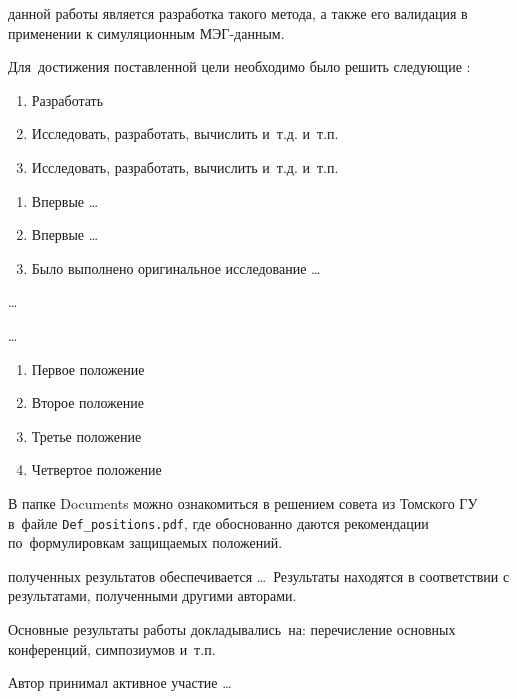 
{\aim} данной работы является разработка такого метода,
а также его валидация в применении к симуляционным МЭГ-данным.

Для~достижения поставленной цели необходимо было решить следующие {\tasks}:
\begin{enumerate}
  \item Разработать 
  \item Исследовать, разработать, вычислить и~т.\:д. и~т.\:п.
  \item Исследовать, разработать, вычислить и~т.\:д. и~т.\:п.
\end{enumerate}


{\novelty}
\begin{enumerate}
  \item Впервые \ldots
  \item Впервые \ldots
  \item Было выполнено оригинальное исследование \ldots
\end{enumerate}

{\influence} \ldots

{\methods} \ldots

{}
\begin{enumerate}
  \item Первое положение
  \item Второе положение
  \item Третье положение
  \item Четвертое положение
\end{enumerate}
В папке Documents можно ознакомиться в решением совета из Томского ГУ
в~файле \verb+Def_positions.pdf+, где обоснованно даются рекомендации
по~формулировкам защищаемых положений.

{\reliability} полученных результатов обеспечивается \ldots \ Результаты находятся в соответствии с результатами, полученными другими авторами.


{\probation}
Основные результаты работы докладывались~на:
перечисление основных конференций, симпозиумов и~т.\:п.

{\contribution} Автор принимал активное участие \ldots


